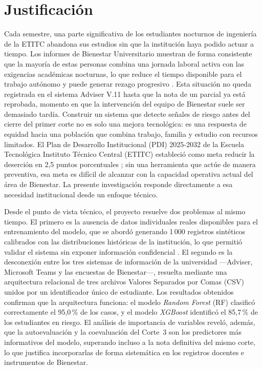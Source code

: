 \documentclass[12pt,letterpaper]{article}
\newcommand{\RF}{\textit{Random Forest} (RF)\xspace}
\newcommand{\XGB}{\textit{XGBoost}\xspace}
\newcommand{\ETITC}{Escuela Tecnológica Instituto Técnico Central (ETITC)\xspace}
\newcommand{\PDI}{Plan de Desarrollo Institucional (PDI)\xspace}
\newcommand{\CSV}{Valores Separados por Comas (CSV)\xspace}
\begin{document}
\newpage

\section{Justificación}

Cada semestre, una parte significativa de los estudiantes nocturnos de ingeniería de la ETITC abandona sus estudios sin que la institución haya podido actuar a tiempo. Los informes de Bienestar Universitario muestran de forma consistente que la mayoría de estas personas combina una jornada laboral activa con las exigencias académicas nocturnas, lo que reduce el tiempo disponible para el trabajo autónomo y puede generar rezago progresivo \parencite{etitc_bienestar}. Esta situación no queda registrada en el sistema Adviser V.11 hasta que la nota de un parcial ya está reprobada, momento en que la intervención del equipo de Bienestar suele ser demasiado tardía. Construir un sistema que detecte señales de riesgo antes del cierre del primer corte no es solo una mejora tecnológica: es una respuesta de equidad hacia una población que combina trabajo, familia y estudio con recursos limitados. El \PDI 2025-2032 de la \ETITC estableció como meta reducir la deserción en 2,5 puntos porcentuales \parencite{etitc2025b}; sin una herramienta que actúe de manera preventiva, esa meta es difícil de alcanzar con la capacidad operativa actual del área de Bienestar. La presente investigación responde directamente a esa necesidad institucional desde un enfoque técnico.

Desde el punto de vista técnico, el proyecto resuelve dos problemas al mismo tiempo. El primero es la ausencia de datos individuales reales disponibles para el entrenamiento del modelo, que se abordó generando 1\,000 registros sintéticos calibrados con las distribuciones históricas de la institución, lo que permitió validar el sistema sin exponer información confidencial \parencite{ley1581}. El segundo es la desconexión entre los tres sistemas de información de la universidad —Adviser, Microsoft Teams y las encuestas de Bienestar—, resuelta mediante una arquitectura relacional de tres archivos \CSV unidos por un identificador único de estudiante. Los resultados obtenidos confirman que la arquitectura funciona: el modelo \RF clasificó correctamente el 95,0\,\% de los casos, y el modelo \XGB identificó el 85,7\,\% de los estudiantes en riesgo. El análisis de importancia de variables reveló, además, que la autoevaluación y la coevaluación del Corte~3 son los predictores más informativos del modelo, superando incluso a la nota definitiva del mismo corte, lo que justifica incorporarlas de forma sistemática en los registros docentes e instrumentos de Bienestar.
\end{document}
